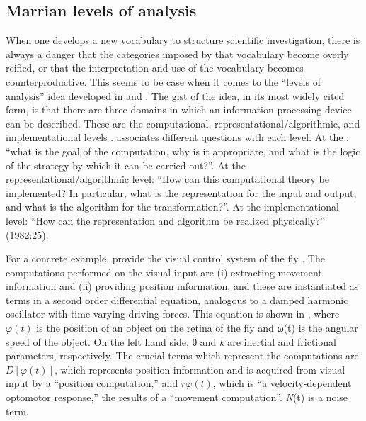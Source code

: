 \subsection{Marrian levels of analysis}

When one develops a new vocabulary to structure scientific investigation, there is always a danger that the categories imposed by that vocabulary become overly reified, or that the interpretation and use of the vocabulary becomes counterproductive. This seems to be case when it comes to the “levels of analysis” idea developed in \citet{Marr1982} and \citet{MarrPoggio1977}. The gist of the idea, in its most widely cited form, is that there are three domains in which an information processing device can be described. These are the computational, representational/algorithmic, and implementational levels \citep{Marr1982}. \citet{Marr1982} associates different questions with each level. At the : “what is the goal of the computation, why is it appropriate, and what is the logic of the strategy by which it can be carried out?”. At the representational/algorithmic level: “How can this computational theory be implemented? In particular, what is the representation for the input and output, and what is the algorithm for the transformation?”. At the implementational level: “How  can the representation and algorithm be realized physically?” (1982:25).

  For a concrete example, \citet{MarrPoggio1977} provide the visual control system of the fly \citep{ReichardtPoggio1976}. The computations performed on the visual input are (i) extracting movement information and (ii) providing position information, and these are instantiated as terms in a second order differential equation, analogous to a damped harmonic oscillator with time-varying driving forces. This equation is shown in , where  $\varphi(t)$ is the position of an object on the retina of the fly and ω(t) is the angular speed of the object. On the left hand side, θ and \textit{k} are inertial and frictional parameters, respectively. The crucial terms which represent the computations are  $D\left[\varphi \left(t\right)\right]$, which represents position information and is acquired from visual input by a “position computation,” and  $r\Dot{{\varphi} }\left(t\right)$, which is “a velocity-dependent optomotor response,” the results of a “movement computation”. \textit{N}(t) is a noise term.



